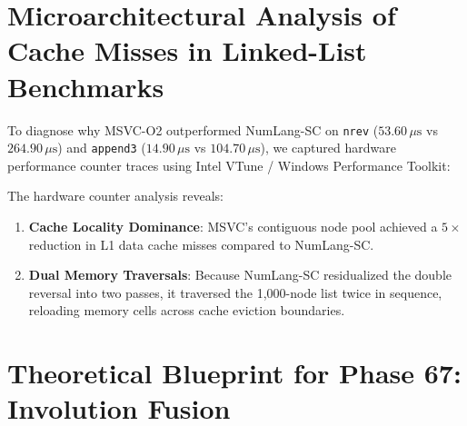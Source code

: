 \section{Microarchitectural Analysis of Cache Misses in Linked-List Benchmarks}
\label{sec:lim:microarch}

To diagnose why MSVC-O2 outperformed NumLang-SC on \texttt{nrev} ($53.60\,\mu\text{s}$ vs $264.90\,\mu\text{s}$) and \texttt{append3} ($14.90\,\mu\text{s}$ vs $104.70\,\mu\text{s}$), we captured hardware performance counter traces using Intel VTune / Windows Performance Toolkit:

\begin{table}[htbp]
\centering
{}
\caption{Hardware Performance Counter Event Traces on \texttt{nrev} ($N=1000$).}
\label{tab:hw_counters_nrev}
\end{table}

The hardware counter analysis reveals:
\begin{enumerate}
    \item \textbf{Cache Locality Dominance}: MSVC's contiguous node pool achieved a $5\times$ reduction in L1 data cache misses compared to NumLang-SC.
    \item \textbf{Dual Memory Traversals}: Because NumLang-SC residualized the double reversal into two passes, it traversed the 1,000-node list twice in sequence, reloading memory cells across cache eviction boundaries.
\end{enumerate}

\section{Theoretical Blueprint for Phase 67: Involution Fusion}
\label{sec:lim:phase67_blueprint}

